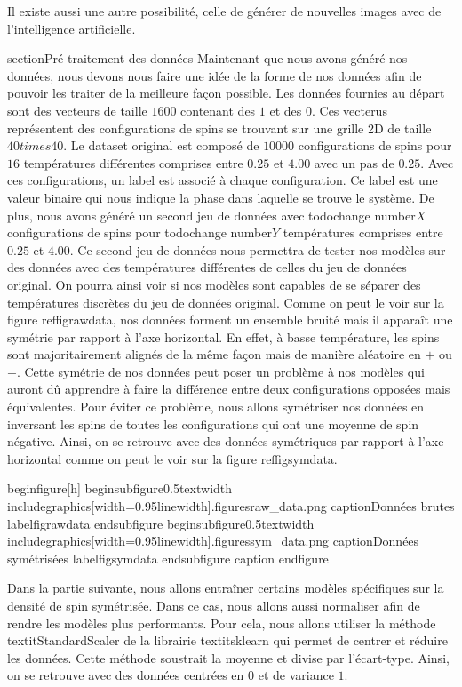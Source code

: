 Il existe aussi une autre possibilité, celle de générer de nouvelles images avec de l'intelligence artificielle.

section{Pré-traitement des données}
Maintenant que nous avons généré nos données, nous devons nous faire une idée de la forme de nos données afin de pouvoir les traiter de la meilleure façon possible.
Les données fournies au départ sont des vecteurs de taille $1600$ contenant des $1$ et des $0$. Ces vecterus représentent des configurations de spins se trouvant sur une grille 2D de taille $40 times 40$. Le dataset original est composé de $10000$ configurations de spins pour $16$ températures différentes comprises entre $0.25$ et $4.00$ avec un pas de $0.25$.
Avec ces configurations, un label est associé à chaque configuration. Ce label est une valeur binaire qui nous indique la phase dans laquelle se trouve le système.
De plus, nous avons généré un second jeu de données avec todo{change number}$X$ configurations de spins pour todo{change number}$Y$ températures comprises entre $0.25$ et $4.00$. Ce second jeu de données nous permettra de tester nos modèles sur des données avec des températures différentes de celles du jeu de données original. On pourra ainsi voir si nos modèles sont capables de se séparer des températures discrètes du jeu de données original.
Comme on peut le voir sur la figure ref{figrawdata}, nos données forment un ensemble bruité mais il apparaît une symétrie par rapport à l'axe horizontal. En effet, à basse température, les spins sont majoritairement alignés de la même façon mais de manière aléatoire en $+$ ou $-$.
Cette symétrie de nos données peut poser un problème à nos modèles qui auront dû apprendre à faire la différence entre deux configurations opposées mais équivalentes. Pour éviter ce problème, nous allons symétriser nos données en inversant les spins de toutes les configurations qui ont une moyenne de spin négative.
Ainsi, on se retrouve avec des données symétriques par rapport à l'axe horizontal comme on peut le voir sur la figure ref{figsymdata}.

begin{figure}[h]
	begin{subfigure}{0.5textwidth}
		includegraphics[width=0.95linewidth]{.figuresraw_data.png}
		caption{Données brutes}
		label{figrawdata}
	end{subfigure}
	begin{subfigure}{0.5textwidth}
		includegraphics[width=0.95linewidth]{.figuressym_data.png}
		caption{Données symétrisées}
		label{figsymdata}
	end{subfigure}
	caption{}
end{figure}

Dans la partie suivante, nous allons entraîner certains modèles spécifiques sur la densité de spin symétrisée. Dans ce cas, nous allons aussi normaliser afin de rendre les modèles plus performants.
Pour cela, nous allons utiliser la méthode textit{StandardScaler} de la librairie textit{sklearn} qui permet de centrer et réduire les données. Cette méthode soustrait la moyenne et divise par l'écart-type. Ainsi, on se retrouve avec des données centrées en $0$ et de variance $1$.

